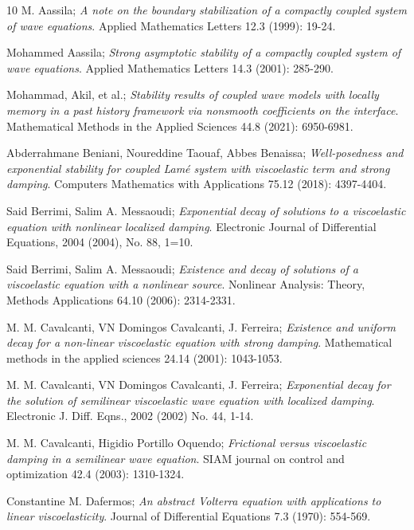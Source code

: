 \documentclass[11pt]{article}
\numberwithin{equation}{section}
\begin{document}
\begin{thebibliography}{10}
 M. Aassila;
\emph{A note on the boundary stabilization of a compactly coupled system of wave
equations}.
 Applied Mathematics Letters 12.3 (1999): 19-24.

  Mohammed Aassila;
\emph{Strong asymptotic stability of a compactly coupled system of wave equations}.
Applied Mathematics Letters 14.3 (2001): 285-290.

  Mohammad, Akil, et al.;
\emph{Stability results of coupled wave models with locally memory in a past history
framework via nonsmooth coefficients on the interface}.
 Mathematical Methods in the Applied Sciences 44.8 (2021): 6950-6981.

 Abderrahmane Beniani,  Noureddine Taouaf,  Abbes Benaissa;
\emph{Well-posedness and exponential stability for coupled Lam\'e system with
viscoelastic term and strong damping}. Computers Mathematics with Applications 75.12 (2018): 4397-4404.

  Said Berrimi, Salim A. Messaoudi;
\emph{Exponential decay of solutions to a viscoelastic equation with nonlinear 
localized damping}. Electronic Journal of Differential Equations,
 2004 (2004), No. 88, 1=10.
 
 Said Berrimi, Salim A. Messaoudi;
\emph{Existence and decay of solutions of a viscoelastic equation with a 
nonlinear source}. Nonlinear Analysis: Theory, Methods Applications 64.10 
(2006): 2314-2331.

 M. M. Cavalcanti, VN Domingos Cavalcanti, J. Ferreira;
\emph{Existence and uniform decay for a non-linear viscoelastic equation with 
strong damping}. Mathematical methods in the applied sciences 24.14 (2001): 1043-1053.

 M. M. Cavalcanti, VN Domingos Cavalcanti, J. Ferreira;
\emph{Exponential decay for the solution of semilinear viscoelastic wave equation 
with localized damping}. Electronic J. Diff. Eqns., 2002 (2002) No. 44, 1-14.

 M. M. Cavalcanti, Higidio Portillo Oquendo;
\emph{Frictional versus viscoelastic damping in a semilinear wave equation}.
 SIAM journal on control and optimization 42.4 (2003): 1310-1324.
 
 Constantine M. Dafermos;
\emph{An abstract Volterra equation with applications to linear viscoelasticity}.
Journal of Differential Equations 7.3 (1970): 554-569.


\end{thebibliography}
\end{document}

